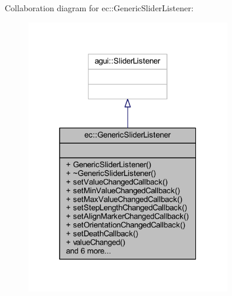 Collaboration diagram for ec\+:\+:Generic\+Slider\+Listener\+:\nopagebreak
\begin{figure}[H]
\begin{center}
\leavevmode
\includegraphics[width=253pt]{classec_1_1_generic_slider_listener__coll__graph}
\end{center}
\end{figure}
